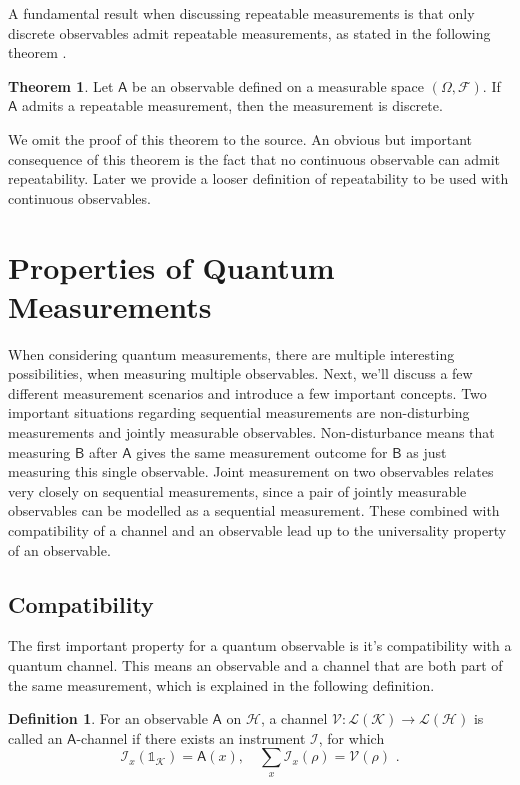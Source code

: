 \documentclass[a4paper,12pt]{wihuri}
\theoremstyle{definition}
\newtheorem{definition}{Definition}
\newtheorem{theorem}{Theorem}
\numberwithin{definition}{section}
\numberwithin{example}{section}
\numberwithin{theorem}{section}
\numberwithin{proposition}{section}
\numberwithin{lemma}{section}
\newcommand{\I}{\mathcal{I}}%
\newcommand{\hi}{\mathcal{H}}%
\newcommand{\ki}{\mathcal{K}}%
\newcommand{\salg}{\mathcal{F}}%
\newcommand{\lin}{\mathcal{L}}%
\newcommand{\V}{\mathcal{V}}%
\newcommand{\A}{\mathsf{A}}%
\newcommand{\B}{\mathsf{B}}%
\newcommand{\id}{\mathds{1}}
\begin{document}
A fundamental result when discussing repeatable measurements is that only discrete observables admit repeatable measurements, as stated in the following theorem \cite{MQP}.
\begin{theorem}
Let $\A$ be an observable defined on a measurable space $(\Omega, \salg)$. If $\A$ admits a repeatable measurement, then the measurement is discrete.
\end{theorem}
We omit the proof of this theorem to the source\cite{MQP}. An obvious but important consequence of this theorem is the fact that no continuous observable can admit repeatability. Later we provide a looser definition of repeatability to be used with continuous observables.

\section{Properties of Quantum Measurements}
When considering quantum measurements, there are multiple interesting possibilities, when measuring multiple observables. Next, we'll discuss a few different measurement scenarios and introduce a few important concepts. Two important situations regarding sequential measurements are non-disturbing measurements and jointly measurable observables. Non-disturbance means that measuring $\B$ after $\A$ gives the same measurement outcome for $\B$ as just measuring this single observable. Joint measurement on two observables relates very closely on sequential measurements, since a pair of jointly measurable observables can be modelled as a sequential measurement. These combined with compatibility of a channel and an observable lead up to the universality property of an observable.


\subsection{Compatibility}
The first important property for a quantum observable is it's compatibility with a quantum channel. This means an observable and a channel that are both part of the same measurement, which is explained in the following definition.

\begin{definition}
For an observable $\A$ on $\hi$, a channel $\V : \lin(\ki) \rightarrow \lin(\hi)$ is called an $\A$-channel if there exists an instrument $\I$, for which 
\begin{equation}
\I_x(\id_{\ki}) = \A(x), \quad \sum_x \I_x(\rho) = \V(\rho)\text{ .}
\end{equation}
\end{definition}
\end{document}
